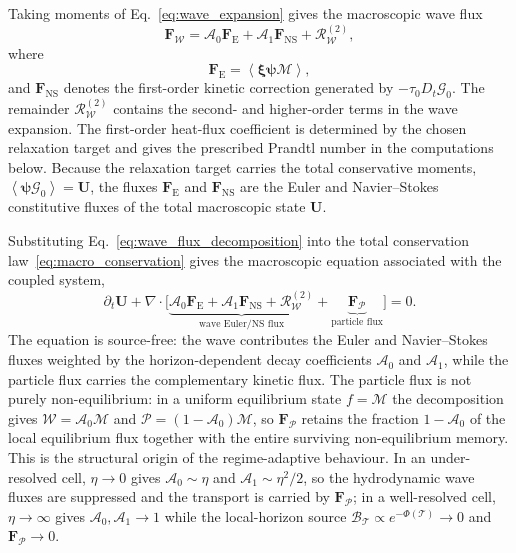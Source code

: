 \documentclass[preprint,12pt]{elsarticle}
\begin{document}
Taking moments of Eq.~\eqref{eq:wave_expansion} gives the macroscopic wave flux
\begin{equation}\label{eq:wave_flux_decomposition}
    \mathbf F_{\mathcal{W}}
    =
    \mathcal A_0\mathbf F_{\mathrm E}
    +\mathcal A_1\mathbf F_{\mathrm{NS}}
    +\mathcal R_{\mathcal{W}}^{(2)} ,
\end{equation}
where
\begin{equation}
    \mathbf F_{\mathrm E}=\left\langle \boldsymbol{\xi}\boldsymbol{\psi}\mathcal{M} \right\rangle,
\end{equation}
and $\mathbf F_{\mathrm{NS}}$ denotes the first-order kinetic correction generated by $-\tau_0D_t\mathcal{G}_0$. The remainder $\mathcal R_{\mathcal{W}}^{(2)}$ contains the second- and higher-order terms in the wave expansion. The first-order heat-flux coefficient is determined by the chosen relaxation target and gives the prescribed Prandtl number in the computations below. Because the relaxation target carries the total conservative moments, $\left\langle \boldsymbol{\psi}\mathcal{G}_0 \right\rangle=\mathbf U$, the fluxes $\mathbf F_{\mathrm E}$ and $\mathbf F_{\mathrm{NS}}$ are the Euler and Navier--Stokes constitutive fluxes of the total macroscopic state $\mathbf U$.

Substituting Eq.~\eqref{eq:wave_flux_decomposition} into the total conservation law~\eqref{eq:macro_conservation} gives the macroscopic equation associated with the coupled system,
\begin{equation}\label{eq:macro_wave_particle_expansion}
    \partial_t\mathbf U
    +\nabla\cdot\Big[
    \underbrace{\mathcal A_0\mathbf F_{\mathrm E}
    +\mathcal A_1\mathbf F_{\mathrm{NS}}
    +\mathcal R_{\mathcal{W}}^{(2)}}_{\text{wave Euler/NS flux}}
    +\underbrace{\mathbf F_{\mathcal{P}}}_{\text{particle flux}}
    \Big]=0 .
\end{equation}
The equation is source-free: the wave contributes the Euler and Navier--Stokes fluxes weighted by the horizon-dependent decay coefficients $\mathcal A_0$ and $\mathcal A_1$, while the particle flux carries the complementary kinetic flux. The particle flux is not purely non-equilibrium: in a uniform equilibrium state $f=\mathcal{M}$ the decomposition gives $\mathcal{W}=\mathcal A_0\mathcal{M}$ and $\mathcal{P}=(1-\mathcal A_0)\mathcal{M}$, so $\mathbf F_{\mathcal{P}}$ retains the fraction $1-\mathcal A_0$ of the local equilibrium flux together with the entire surviving non-equilibrium memory. This is the structural origin of the regime-adaptive behaviour. In an under-resolved cell, $\eta\to0$ gives $\mathcal A_0\sim\eta$ and $\mathcal A_1\sim\eta^2/2$, so the hydrodynamic wave fluxes are suppressed and the transport is carried by $\mathbf F_{\mathcal{P}}$; in a well-resolved cell, $\eta\to\infty$ gives $\mathcal A_0,\mathcal A_1\to1$ while the local-horizon source $\mathcal B_{\mathcal T}\propto e^{-\Phi(\mathcal{T})}\to0$ and $\mathbf F_{\mathcal{P}}\to0$.
\end{document}
